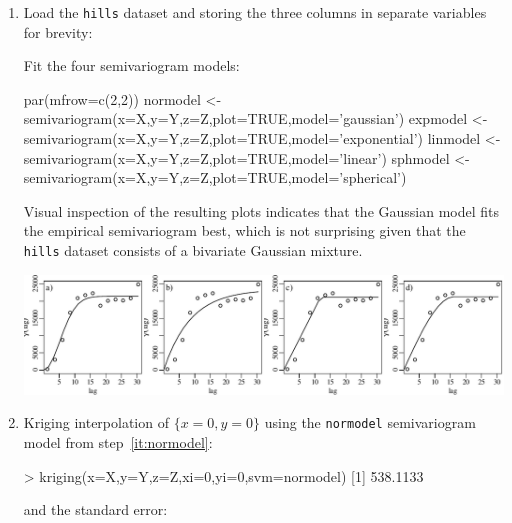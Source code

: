 \begin{enumerate}
  
\item\label{it:normodel} Load the \texttt{hills} dataset and storing
  the three columns in separate variables for brevity:


Fit the four semivariogram models:

\begin{script}[firstnumber=5]
par(mfrow=c(2,2))
normodel <- semivariogram(x=X,y=Y,z=Z,plot=TRUE,model='gaussian')
expmodel <- semivariogram(x=X,y=Y,z=Z,plot=TRUE,model='exponential')
linmodel <- semivariogram(x=X,y=Y,z=Z,plot=TRUE,model='linear')
sphmodel <- semivariogram(x=X,y=Y,z=Z,plot=TRUE,model='spherical')
\end{script}

Visual inspection of the resulting plots indicates that the Gaussian
model fits the empirical semivariogram best, which is not surprising
given that the \texttt{hills} dataset consists of a bivariate Gaussian
mixture.

\noindent\begin{minipage}[t][][b]{\indentwidth}
\includegraphics[width=\indentwidth]{../figures/hills.pdf}
\end{minipage}
\begin{minipage}[t][][t]{\indentwidth}
\end{minipage}

\item Kriging interpolation of $\{x=0,y=0\}$ using the
  \texttt{normodel} semivariogram model from step~\ref{it:normodel}:

\begin{console}
> kriging(x=X,y=Y,z=Z,xi=0,yi=0,svm=normodel)
[1] 538.1133
\end{console}

\noindent and the standard error:


\end{enumerate}
